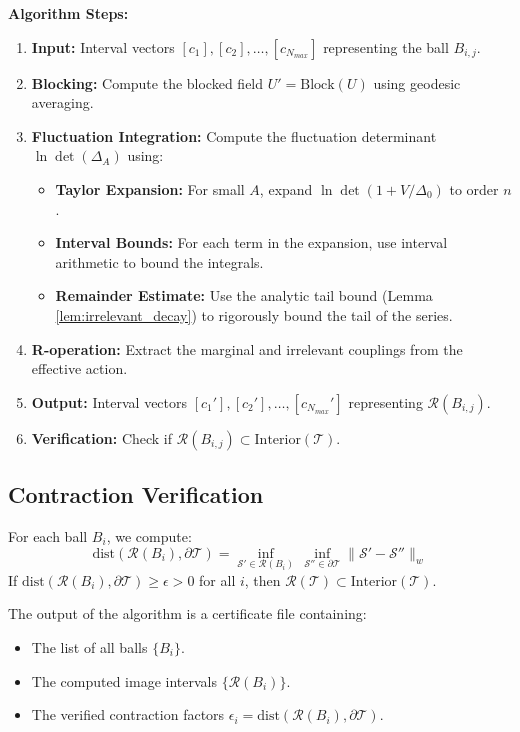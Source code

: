 \textbf{Algorithm Steps:}
\begin{enumerate}
    \item \textbf{Input:} Interval vectors $[c_1], [c_2], \dots, [c_{N_{max}}]$ representing the ball $B_{i,j}$.
    \item \textbf{Blocking:} Compute the blocked field $U' = \text{Block}(U)$ using geodesic averaging.
    \item \textbf{Fluctuation Integration:} Compute the fluctuation determinant $\ln \det(\Delta_A)$ using:
    \begin{itemize}
        \item \textbf{Taylor Expansion:} For small $A$, expand $\ln \det(1 + V/\Delta_0)$ to order $n$.
        \item \textbf{Interval Bounds:} For each term in the expansion, use interval arithmetic to bound the integrals.
        \item \textbf{Remainder Estimate:} Use the analytic tail bound (Lemma \ref{lem:irrelevant_decay}) to rigorously bound the tail of the series.
    \end{itemize}
    \item \textbf{R-operation:} Extract the marginal and irrelevant couplings from the effective action.
    \item \textbf{Output:} Interval vectors $[c_1'], [c_2'], \dots, [c_{N_{max}}']$ representing $\mathcal{R}(B_{i,j})$.
    \item \textbf{Verification:} Check if $\mathcal{R}(B_{i,j}) \subset \text{Interior}(\mathcal{T})$.
\end{enumerate}

\subsection{Contraction Verification}

\begin{definition}
For each ball $B_i$, we compute:
\begin{equation}
\text{dist}(\mathcal{R}(B_i), \partial \mathcal{T}) = \inf_{\mathcal{S}' \in \mathcal{R}(B_i)} \, \inf_{\mathcal{S}'' \in \partial \mathcal{T}} \| \mathcal{S}' - \mathcal{S}'' \|_w
\end{equation}
If $\text{dist}(\mathcal{R}(B_i), \partial \mathcal{T}) \ge \epsilon > 0$ for all $i$, then $\mathcal{R}(\mathcal{T}) \subset \text{Interior}(\mathcal{T})$.
\end{definition}

The output of the algorithm is a certificate file containing:
\begin{itemize}
    \item The list of all balls $\{B_i\}$.
    \item The computed image intervals $\{\mathcal{R}(B_i)\}$.
    \item The verified contraction factors $\epsilon_i = \text{dist}(\mathcal{R}(B_i), \partial \mathcal{T})$.
\end{itemize}

